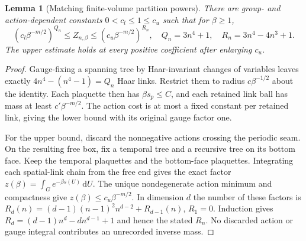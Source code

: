 \documentclass[11pt,letterpaper]{article}
\theoremstyle{plain}
\newtheorem{lemma}[theorem]{Lemma}
\theoremstyle{remark}\newtheorem{remark}[theorem]{Scope}
\newcommand{\dd}{\,\mathrm d}\newcommand{\OH}{\mathcal O_H}
\begin{document}
\begin{lemma}[Matching finite-volume partition powers]
\label{lem:partition}
There are group- and action-dependent constants $0<c_l\le1\le c_u$ such that
for $\beta\ge1$,
\begin{equation}
(c_l\beta^{-m/2})^{Q_n}\le Z_{n,\beta}
\le(c_u\beta^{-m/2})^{R_n},\quad
Q_n=3n^4+1,\quad R_n=3n^4-4n^3+1.
\label{eq:partition}
\end{equation}
The upper estimate holds at every positive coefficient after enlarging $c_u$.
\end{lemma}
\begin{proof}
Gauge-fixing a spanning tree by Haar-invariant changes of variables leaves exactly
$4n^4-(n^4-1)=Q_n$ Haar links. Restrict them to radius $c\beta^{-1/2}$ about the
identity. Each plaquette then has $\beta s_p\le C$, and each retained link ball
has mass at least $c'\beta^{-m/2}$. The action cost is at most a fixed constant
per retained link, giving the lower bound with its original gauge factor one.

For the upper bound, discard the nonnegative actions crossing the periodic seam.
On the resulting free box, fix a temporal tree and a recursive tree on its bottom
face. Keep the temporal plaquettes and the bottom-face plaquettes. Integrating
each spatial-link chain from the free end gives the exact factor
$z(\beta)=\int_Ge^{-\beta s(U)}\dd U$. The unique nondegenerate action minimum
and compactness give $z(\beta)\le c_u\beta^{-m/2}$. In dimension $d$ the number
of these factors is
$R_d(n)=(d-1)(n-1)^2n^{d-2}+R_{d-1}(n)$, $R_1=0$.
Induction gives $R_d=(d-1)n^d-dn^{d-1}+1$ and hence the stated $R_n$.
No discarded action or gauge integral contributes an unrecorded inverse mass.
\end{proof}
\end{document}
